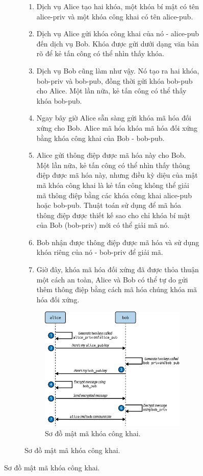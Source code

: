 \documentclass[12pt,a4paper]{report}
\begin{document}
\begin{figure}[h]
\begin{figure}[h]
	\hspace{0.3cm}{Hãy xem qua một ví dụ sử dụng hai dịch vụ tưởng tượng, Alice và Bob, muốn đồng ý về một khóa mã hóa đối xứng:}
	
	\begin{enumerate}
	\item Dịch vụ Alice tạo hai khóa, một khóa bí mật có tên alice-priv và một khóa công khai có tên alice-pub.
	\item Dịch vụ Alice gửi khóa công khai của nó - alice-pub đến dịch vụ Bob. Khóa được gửi dưới dạng văn bản rõ để kẻ tấn công có thể nhìn thấy khóa.
	\item Dịch vụ Bob cũng làm như vậy. Nó tạo ra hai khóa, bob-priv và bob-pub, đồng thời gửi khóa bob-pub cho Alice. Một lần nữa, kẻ tấn công có thể thấy khóa bob-pub.
	\item Ngay bây giờ Alice sẵn sàng gửi khóa mã hóa đối xứng cho Bob. Alice mã hóa khóa mã hóa đối xứng bằng khóa công khai của Bob - bob-pub.
	\item Alice gửi thông điệp được mã hóa này cho Bob. Một lần nữa, kẻ tấn công có thể nhìn thấy thông điệp được mã hóa này, nhưng điều kỳ diệu của mật mã khóa công khai là kẻ tấn công không thể giải mã thông điệp bằng các khóa công khai alice-pub hoặc bob-pub. Thuật toán sử dụng để mã hóa thông điệp được thiết kế sao cho chỉ khóa bí mật của Bob (bob-priv) mới có thể giải mã nó.
	\item Bob nhận được thông điệp được mã hóa và sử dụng khóa riêng của nó - bob-priv để giải mã.
	\item Giờ đây, khóa mã hóa đối xứng đã được thỏa thuận một cách an toàn, Alice và Bob có thể tự do gửi thêm thông điệp bằng cách mã hóa chúng khóa mã hóa đối xứng.
	\end{enumerate}

	\begin{figure}[h]
		\centering
		\includegraphics[width=0.7\linewidth]{Pics/public-key_cryptography}
		\caption{\label{fig:public-keycryptography} Sơ đồ mật mã khóa công khai.}
		\label{fig:public-keycryptography}
	\end{figure}
	

\end{figure}
\end{figure}
\end{document}
